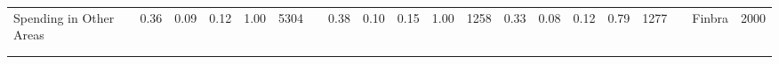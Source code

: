\begin{sidewaystable}
\begin{table}[H]
\begin{footnotesize}
\begin{center}
{\begin{threeparttable}[b]
\begin{tabular}{rrrrrrrrrrrrrrrrrrrr}
    \multicolumn{1}{l}{Spending in Other Areas} & \multicolumn{1}{c}{0.36} & \multicolumn{1}{c}{0.09} & \multicolumn{1}{c}{0.12} & \multicolumn{1}{c}{1.00} & \multicolumn{1}{c}{5304} &       & \multicolumn{1}{c}{0.38} & \multicolumn{1}{c}{0.10} & \multicolumn{1}{c}{0.15} & \multicolumn{1}{c}{1.00} & \multicolumn{1}{c}{1258} & \multicolumn{1}{c}{0.33} & \multicolumn{1}{c}{0.08} & \multicolumn{1}{c}{0.12} & \multicolumn{1}{c}{0.79} & \multicolumn{1}{c}{1277} &       & \multicolumn{1}{c}{Finbra} & \multicolumn{1}{c}{2000} \\
          &       &       &       &       &       &       &       &       &       &       &       &       &       &       &       &       &       &       &  \\
    \midrule
    \midrule
          &       &       &       &       &       &       &       &       &       &       &       &       &       &       &       &       &       &       &  \\
    \end{tabular}%
    
  \label{table:stats}%

\end{threeparttable}
}
\end{center}
\end{footnotesize}
\end{table}
\end{sidewaystable}